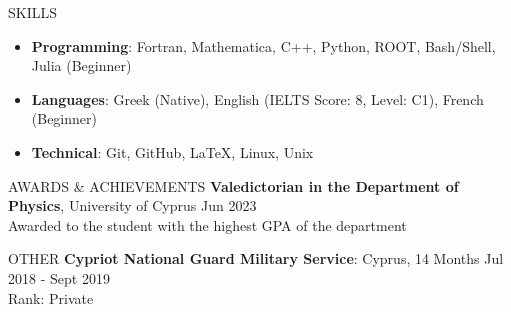 \documentclass{resume} %
\begin{document}
        \bigbreak

        \begin{rSection}{SKILLS}
                \begin{itemize}
                        \itemsep -3pt {} 
                        \item \textbf{Programming}: Fortran, Mathematica, C++, Python, ROOT, Bash/Shell, Julia (Beginner)
                        \item \textbf{Languages}: Greek (Native), English (IELTS Score: 8, Level: C1), French (Beginner)
                        \item \textbf{Technical}: Git, GitHub, \LaTeX, Linux, Unix
                \end{itemize}
        \end{rSection}

        \bigbreak

        \begin{rSection}{AWARDS \& ACHIEVEMENTS}
                {\bf Valedictorian in the Department of Physics}, University of Cyprus \hfill Jun 2023\\
                Awarded to the student with the highest GPA of the department
                
                
        \end{rSection} 

        \bigbreak

        \begin{rSection}{OTHER}
                {\bf Cypriot National Guard Military Service}: Cyprus, 14 Months \hfill {Jul 2018 - Sept 2019}\\
                Rank: Private
        \end{rSection}

        \bigbreak

\end{document}
